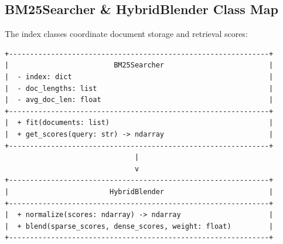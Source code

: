 \documentclass[11pt,journal,onecolumn]{IEEEtran}
\begin{document}
\subsection{BM25Searcher \& HybridBlender Class Map}
The index classes coordinate document storage and retrieval scores:
\begin{verbatim}
+--------------------------------------------------------------+
|                         BM25Searcher                         |
|  - index: dict                                               |
|  - doc_lengths: list                                         |
|  - avg_doc_len: float                                        |
+--------------------------------------------------------------+
|  + fit(documents: list)                                      |
|  + get_scores(query: str) -> ndarray                         |
+--------------------------------------------------------------+
                               |
                               v
+--------------------------------------------------------------+
|                        HybridBlender                         |
+--------------------------------------------------------------+
|  + normalize(scores: ndarray) -> ndarray                     |
|  + blend(sparse_scores, dense_scores, weight: float)         |
+--------------------------------------------------------------+
\end{verbatim}
\end{document}
